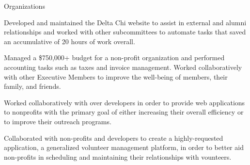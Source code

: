 \documentclass{resume} %
\begin{document}
\begin{workSection}{Organizations}
    \customItem[
        title=Delta Chi Fraternity,
        keyHighlight=Treasurer{,} Technology Chair,
        duration=August 2021 – Present,
        location=Atlanta{,} GA
    ]
     \begin{bullets}
         \item Developed and maintained the Delta Chi website to assist in external and alumni relationships and worked with other subcommittees to automate tasks that saved an accumulative of 20 hours of work overall.
        \item Managed a \$750,000+ budget for a non-profit organization and performed accounting tasks such as taxes and invoice management. Worked collaboratively with other Executive Members to improve the well-being of members, their family, and friends.
     \end{bullets}
     
     \customItem[
        title=Bits of Good,
        keyHighlight=Developer,
        duration=January 2023 – Present,
        location=Atlanta{,} GA
    ]
     \begin{bullets}
       \item Worked collaboratively with over developers in order to provide web applications to nonprofits with the primary goal of either increasing their overall efficiency or to improve their outreach programs.
       \item Collaborated with non-profits and developers to create a highly-requested application, a generalized volunteer management platform, in order to better aid non-profits in scheduling and maintaining their relationships with vounteers.

     \end{bullets}
\end{workSection}
\end{document}
